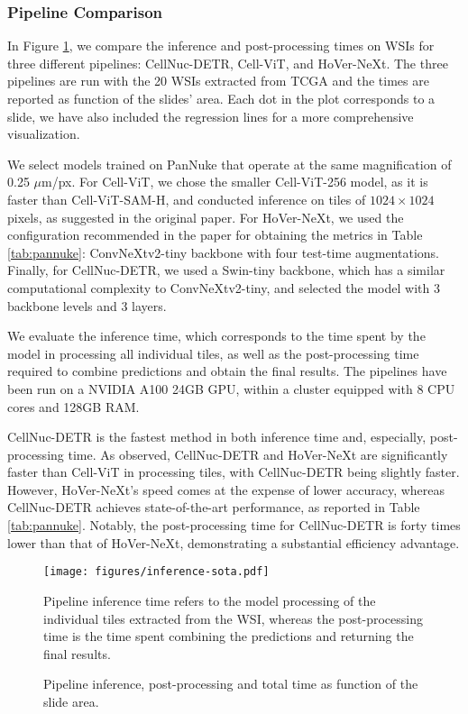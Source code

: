 \subsubsection{Pipeline Comparison}
\label{sec:results:time:sota}

In Figure \ref{fig:results:inference-sota}, we compare the inference and post-processing times on WSIs for three different pipelines: CellNuc-DETR, Cell-ViT, and HoVer-NeXt. The three pipelines are run with the 20 WSIs extracted from TCGA and the times are reported as function of the slides' area. Each dot in the plot corresponds to a slide, we have also included the regression lines for a more comprehensive visualization.

We select models trained on PanNuke that operate at the same magnification of 0.25 $\mu$m/px. For Cell-ViT, we chose the smaller Cell-ViT-256 model, as it is faster than Cell-ViT-SAM-H, and conducted inference on tiles of $1024 \times 1024$ pixels, as suggested in the original paper. For HoVer-NeXt, we used the configuration recommended in the paper for obtaining the metrics in Table \ref{tab:pannuke}: ConvNeXtv2-tiny backbone with four test-time augmentations. Finally, for CellNuc-DETR, we used a Swin-tiny backbone, which has a similar computational complexity to ConvNeXtv2-tiny, and selected the model with 3 backbone levels and 3 layers.

We evaluate the inference time, which corresponds to the time spent by the model in processing all individual tiles, as well as the post-processing time required to combine predictions and obtain the final results. The pipelines have been run on a NVIDIA A100 24GB GPU, within a cluster equipped with 8 CPU cores and 128GB RAM.

CellNuc-DETR is the fastest method in both inference time and, especially, post-processing time. As observed, CellNuc-DETR and HoVer-NeXt are significantly faster than Cell-ViT in processing tiles, with CellNuc-DETR being slightly faster. However, HoVer-NeXt's speed comes at the expense of lower accuracy, whereas CellNuc-DETR achieves state-of-the-art performance, as reported in Table \ref{tab:pannuke}. Notably, the post-processing time for CellNuc-DETR is forty times lower than that of HoVer-NeXt, demonstrating a substantial efficiency advantage.

\begin{figure}[h]
    \centering
    \texttt{[image: figures/inference-sota.pdf]}
    \caption{Pipeline inference, post-processing and total time as function of the slide area.}
    \label{fig:results:inference-sota}
    \footnotesize{Pipeline inference time refers to the model processing of the individual tiles extracted from the WSI, whereas the post-processing time is the time spent combining the predictions and returning the final results.}
\end{figure}

